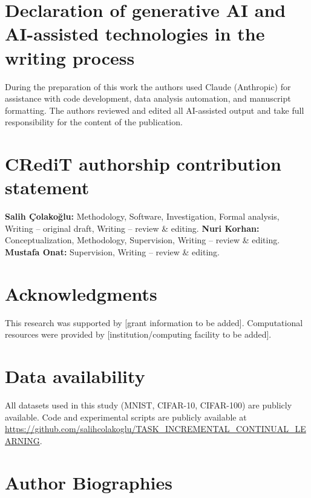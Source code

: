 \documentclass[preprint,review,12pt]{elsarticle}
\begin{document}
\section*{Declaration of generative AI and AI-assisted technologies in the writing process}

During the preparation of this work the authors used Claude (Anthropic) for assistance with code development, data analysis automation, and manuscript formatting. The authors reviewed and edited all AI-assisted output and take full responsibility for the content of the publication.

\section*{CRediT authorship contribution statement}

\textbf{Salih \c{C}olako\u{g}lu:} Methodology, Software, Investigation, Formal analysis, Writing -- original draft, Writing -- review \& editing.
\textbf{Nuri Korhan:} Conceptualization, Methodology, Supervision, Writing -- review \& editing.
\textbf{Mustafa Onat:} Supervision, Writing -- review \& editing.

\section*{Acknowledgments}

This research was supported by [grant information to be added]. Computational resources were provided by [institution/computing facility to be added].

\section*{Data availability}

All datasets used in this study (MNIST, CIFAR-10, CIFAR-100) are publicly available. Code and experimental scripts are publicly available at \url{https://github.com/salihcolakoglu/TASK_INCREMENTAL_CONTINUAL_LEARNING}.




\section*{Author Biographies}
\end{document}
